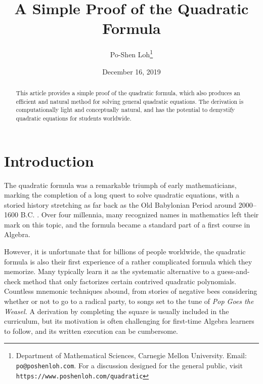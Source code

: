 \documentclass[11pt]{article}
\begin{document}
\title{A Simple Proof of the Quadratic Formula}

\author{Po-Shen Loh\thanks{Department of Mathematical Sciences, Carnegie Mellon
  University. Email: \texttt{po@poshenloh.com}. For a discussion designed for
  the general public, visit \texttt{https://www.poshenloh.com/quadratic}}}

\date{December 16, 2019}

\maketitle

\begin{abstract}
  This article provides a simple proof of the quadratic formula, which also
  produces an efficient and natural method for solving general quadratic
  equations. The derivation is computationally light and conceptually natural,
  and has the potential to demystify quadratic equations for students worldwide.
\end{abstract}

\section{Introduction}

The quadratic formula was a remarkable triumph of early mathematicians, marking
the completion of a long quest to solve quadratic equations, with a storied
history stretching as far back as the Old Babylonian Period around 2000--1600
B.C.  \cite{katz, robson}. 
Over four millennia, many recognized names in mathematics left their mark on
this topic, and the formula became a standard part of a first course in Algebra.

However, it is unfortunate that for billions of people worldwide, the quadratic
formula is also their first experience of a rather complicated formula which
they memorize. Many typically learn it as the systematic alternative to a
guess-and-check method that only factorizes certain contrived quadratic
polynomials. Countless mnemonic techniques abound, from stories of negative bees
considering whether or not to go to a radical party, to songs set to the tune of
\emph{Pop Goes the Weasel.} A derivation by completing the square is usually
included in the curriculum, but its motivation is often challenging for
first-time Algebra learners to follow, and its written execution can be
cumbersome.
\end{document}
